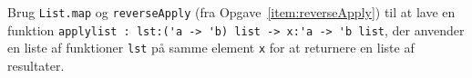Brug \lstinline{List.map} og \lstinline{reverseApply} (fra Opgave~\ref{item:reverseApply}) til at lave en funktion \lstinline{applylist : lst:('a -> 'b) list -> x:'a -> 'b list}, der anvender en liste af funktioner \lstinline{lst} på samme element \lstinline{x} for at returnere en liste af resultater.
